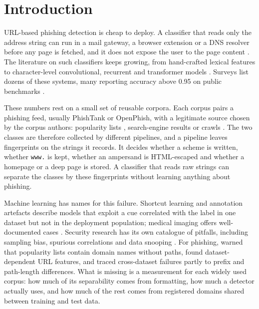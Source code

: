 \section{Introduction}
\label{sec:intro}

URL-based phishing detection is cheap to deploy. A classifier that reads only the address string can run in a mail gateway, a browser extension or a DNS resolver before any page is fetched, and it does not expose the user to the page content \citep{ma2009,khonji2013,sahoo2017}. The literature on such classifiers keeps growing, from hand-crafted lexical features \citep{garera2007,blum2010,verma2015} to character-level convolutional, recurrent and transformer models \citep{bahnsen2017,le2018urlnet,tajaddodianfar2020,aljofey2020,maneriker2021,bozkir2023}. Surveys list dozens of these systems, many reporting accuracy above 0.95 on public benchmarks \citep{zieni2023,safi2023,basit2021}.

These numbers rest on a small set of reusable corpora. Each corpus pairs a phishing feed, usually PhishTank or OpenPhish, with a legitimate source chosen by the corpus authors: popularity lists \citep{wang2019pdrcnn,prasad2024}, search-engine results \citep{sahingoz2019} or crawls \citep{mamun2016}. The two classes are therefore collected by different pipelines, and a pipeline leaves fingerprints on the strings it records. It decides whether a scheme is written, whether \texttt{www.} is kept, whether an ampersand is HTML-escaped and whether a homepage or a deep page is stored. A classifier that reads raw strings can separate the classes by these fingerprints without learning anything about phishing.

Machine learning has names for this failure. Shortcut learning \citep{geirhos2020} and annotation artefacts \citep{gururangan2018,mccoy2019} describe models that exploit a cue correlated with the label in one dataset but not in the deployment population; medical imaging offers well-documented cases \citep{zech2018,degrave2021,lapuschkin2019}. Security research has its own catalogue of pitfalls, including sampling bias, spurious correlations and data snooping \citep{arp2022,arp2024,sommer2010,pendlebury2019,apruzzese2023}. For phishing, \citet{marchal2018} warned that popularity lists contain domain names without paths, \citet{shirazi2018} found dataset-dependent URL features, and \citet{rashid2024} traced cross-dataset failures partly to prefix and path-length differences. What is missing is a measurement for each widely used corpus: how much of its separability comes from formatting, how much a detector actually uses, and how much of the rest comes from registered domains shared between training and test data.


